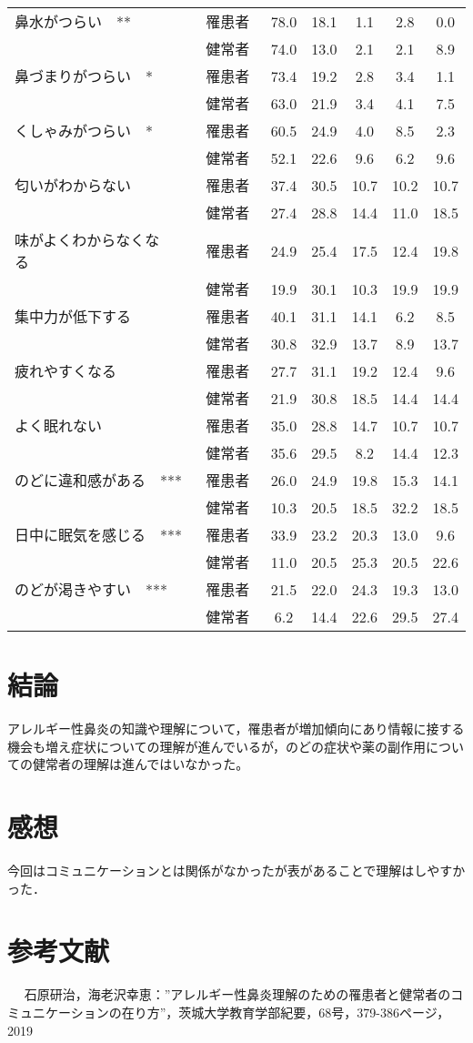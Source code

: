 \documentclass{jsarticle}
\begin{document}
\begin{table}[h]
{\begin{tabular}{lcccccc}
 \hline\hline
鼻水がつらい~~** & 罹患者　& 78.0 & 18.1 & 1.1 & 2.8 & 0.0\\ 
                 & 健常者　& 74.0 & 13.0 & 2.1 & 2.1 & 8.9  \\ \hline
鼻づまりがつらい~~* & 罹患者　& 73.4 & 19.2 & 2.8 & 3.4 & 1.1\\ 
                 & 健常者　& 63.0 & 21.9 & 3.4 & 4.1 & 7.5  \\ \hline
くしゃみがつらい~~* & 罹患者　& 60.5 & 24.9 & 4.0 & 8.5 & 2.3\\ 
                 & 健常者　& 52.1 & 22.6 & 9.6 & 6.2 & 9.6  \\ \hline
匂いがわからない~~ & 罹患者　& 37.4 & 30.5 & 10.7 & 10.2 & 10.7\\ 
                 & 健常者　& 27.4 & 28.8 & 14.4 & 11.0 & 18.5  \\ \hline 
味がよくわからなくなる~~ & 罹患者　& 24.9 & 25.4 & 17.5 & 12.4 & 19.8\\ 
                 & 健常者　& 19.9 & 30.1 & 10.3 & 19.9 & 19.9  \\ \hline
集中力が低下する~~ & 罹患者　& 40.1 & 31.1 & 14.1 & 6.2 & 8.5\\ 
                 & 健常者　& 30.8 & 32.9 & 13.7 & 8.9 & 13.7  \\ \hline
疲れやすくなる~~ & 罹患者　& 27.7 & 31.1 & 19.2 & 12.4 & 9.6\\ 
                 & 健常者　& 21.9 & 30.8 & 18.5 & 14.4 & 14.4  \\ \hline
よく眠れない~~ & 罹患者　& 35.0 & 28.8 & 14.7 & 10.7 & 10.7\\ 
                 & 健常者　& 35.6 & 29.5 & 8.2 & 14.4 & 12.3  \\ \hline
のどに違和感がある~~*** & 罹患者　& 26.0 & 24.9 & 19.8 & 15.3 & 14.1\\ 
                 & 健常者　& 10.3 & 20.5 & 18.5 & 32.2 & 18.5  \\ \hline
日中に眠気を感じる~~*** & 罹患者　& 33.9 & 23.2 & 20.3 & 13.0 & 9.6\\ 
                 & 健常者　& 11.0 & 20.5 & 25.3 & 20.5 & 22.6  \\ \hline 
のどが渇きやすい~~*** & 罹患者　& 21.5 & 22.0 & 24.3 & 19.3 & 13.0\\ 
                 & 健常者　& 6.2 & 14.4 & 22.6 & 29.5 & 27.4  \\ \hline
\end{tabular}
}
\end{table}
\section{結論}
アレルギー性鼻炎の知識や理解について，罹患者が増加傾向にあり情報に接する機会も増え症状についての理解が進んでいるが，のどの症状や薬の副作用についての健常者の理解は進んではいなかった。
\section{感想}
今回はコミュニケーションとは関係がなかったが表があることで理解はしやすかった．
\section{参考文献}　
石原研治，海老沢幸恵：”アレルギー性鼻炎理解のための罹患者と健常者のコミュニケーションの在り方”，茨城大学教育学部紀要，68号，379-386ページ，2019
\end{document}
